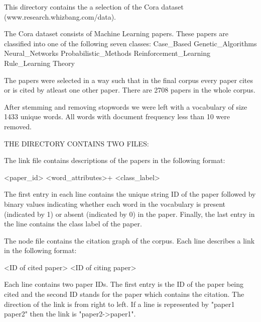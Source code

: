 This directory contains the a selection of the Cora dataset (www.research.whizbang.com/data).

The Cora dataset consists of Machine Learning papers. These papers are classified into one of the following seven classes:
		Case_Based
		Genetic_Algorithms
		Neural_Networks
		Probabilistic_Methods
		Reinforcement_Learning
		Rule_Learning
		Theory

The papers were selected in a way such that in the final corpus every paper cites or is cited by atleast one other paper. There are 2708 papers in the whole corpus. 

After stemming and removing stopwords we were left with a vocabulary of size 1433 unique words. All words with document frequency less than 10 were removed.


THE DIRECTORY CONTAINS TWO FILES:

The link file contains descriptions of the papers in the following format:

		<paper_id> <word_attributes>+ <class_label>

The first entry in each line contains the unique string ID of the paper followed by binary values indicating whether each word in the vocabulary is present (indicated by 1) or absent (indicated by 0) in the paper. Finally, the last entry in the line contains the class label of the paper.

The node file contains the citation graph of the corpus. Each line describes a link in the following format:

		<ID of cited paper> <ID of citing paper>

Each line contains two paper IDs. The first entry is the ID of the paper being cited and the second ID stands for the paper which contains the citation. The direction of the link is from right to left. If a line is represented by "paper1 paper2" then the link is "paper2->paper1". 
